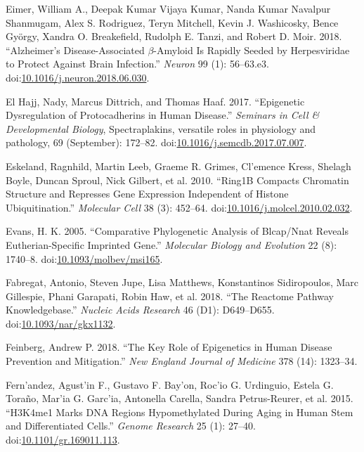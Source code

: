\documentclass[onehalf,12pt]{beavtex}
\begin{document}
  \hypertarget{ref-EimerAlzheimerDiseaseAssociatedvAmyloid2018}{}
  Eimer, William A., Deepak Kumar Vijaya Kumar, Nanda Kumar Navalpur
  Shanmugam, Alex S. Rodriguez, Teryn Mitchell, Kevin J. Washicosky, Bence
  György, Xandra O. Breakefield, Rudolph E. Tanzi, and Robert D. Moir.
  2018. ``Alzheimer's Disease-Associated \(\beta\)-Amyloid Is Rapidly
  Seeded by Herpesviridae to Protect Against Brain Infection.''
  \emph{Neuron} 99 (1): 56--63.e3.
  doi:\href{https://doi.org/10.1016/j.neuron.2018.06.030}{10.1016/j.neuron.2018.06.030}.
  
  \hypertarget{ref-ElHajjEpigeneticdysregulationprotocadherins2017d}{}
  El Hajj, Nady, Marcus Dittrich, and Thomas Haaf. 2017. ``Epigenetic
  Dysregulation of Protocadherins in Human Disease.'' \emph{Seminars in
  Cell \& Developmental Biology}, Spectraplakins, versatile roles in
  physiology and pathology, 69 (September): 172--82.
  doi:\href{https://doi.org/10.1016/j.semcdb.2017.07.007}{10.1016/j.semcdb.2017.07.007}.
  
  \hypertarget{ref-EskelandRing1BCompactsChromatin2010}{}
  Eskeland, Ragnhild, Martin Leeb, Graeme R. Grimes, Cl\a'emence Kress,
  Shelagh Boyle, Duncan Sproul, Nick Gilbert, et al. 2010. ``Ring1B
  Compacts Chromatin Structure and Represses Gene Expression Independent
  of Histone Ubiquitination.'' \emph{Molecular Cell} 38 (3): 452--64.
  doi:\href{https://doi.org/10.1016/j.molcel.2010.02.032}{10.1016/j.molcel.2010.02.032}.
  
  \hypertarget{ref-EvansComparativePhylogeneticAnalysis2005}{}
  Evans, H. K. 2005. ``Comparative Phylogenetic Analysis of Blcap/Nnat
  Reveals Eutherian-Specific Imprinted Gene.'' \emph{Molecular Biology and
  Evolution} 22 (8): 1740--8.
  doi:\href{https://doi.org/10.1093/molbev/msi165}{10.1093/molbev/msi165}.
  
  \hypertarget{ref-FabregatReactomePathwayKnowledgebase2018}{}
  Fabregat, Antonio, Steven Jupe, Lisa Matthews, Konstantinos
  Sidiropoulos, Marc Gillespie, Phani Garapati, Robin Haw, et al. 2018.
  ``The Reactome Pathway Knowledgebase.'' \emph{Nucleic Acids Research} 46
  (D1): D649--D655.
  doi:\href{https://doi.org/10.1093/nar/gkx1132}{10.1093/nar/gkx1132}.
  
  \hypertarget{ref-Feinbergkeyroleepigenetics2018}{}
  Feinberg, Andrew P. 2018. ``The Key Role of Epigenetics in Human Disease
  Prevention and Mitigation.'' \emph{New England Journal of Medicine} 378
  (14): 1323--34.
  
  \hypertarget{ref-FernandezH3K4me1marksDNA2015}{}
  Fern\a'andez, Agust\a'in F., Gustavo F. Bay\a'on, Roc\a'io G. Urdinguio,
  Estela G. Toraño, Mar\a'ia G. Garc\a'ia, Antonella Carella, Sandra
  Petrus-Reurer, et al. 2015. ``H3K4me1 Marks DNA Regions Hypomethylated
  During Aging in Human Stem and Differentiated Cells.'' \emph{Genome
  Research} 25 (1): 27--40.
  doi:\href{https://doi.org/10.1101/gr.169011.113}{10.1101/gr.169011.113}.
  
\end{document}
